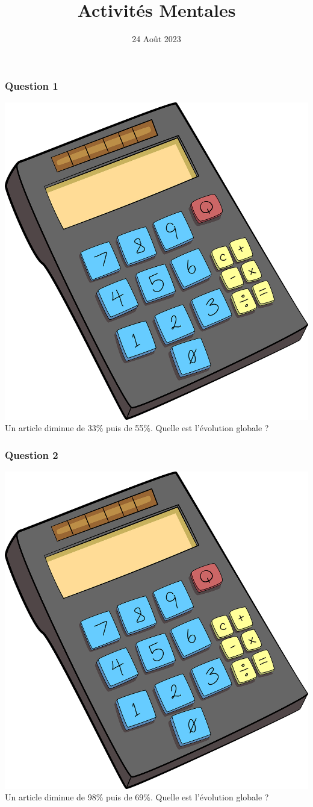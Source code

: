 \documentclass[15pt, mathserif]{beamer}
\title{Activités Mentales}
\date{24 Août 2023}
\begin{document}
\begin{frame}
    \titlepage
\end{frame}

\begin{frame} 
	\frametitle{Question 1}
\includegraphics[scale=0.01]{calculatrice} Un article diminue de 33\% puis de 55\%. Quelle est l'évolution globale ?\end{frame}


\begin{frame} 
	\frametitle{Question 2}
\includegraphics[scale=0.01]{calculatrice} Un article diminue de 98\% puis de 69\%. Quelle est l'évolution globale ?\end{frame}
\end{document}
